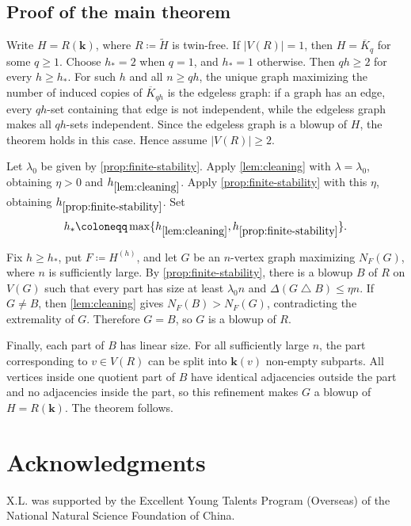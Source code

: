 \documentclass[10pt]{article}
\theoremstyle{plain}
\theoremstyle{remark}
\newcommand{\symdiff}{\mathbin{\triangle}}
\begin{document}
\subsection{Proof of the main theorem}
\label{sec:main-proof}

Write $H=R(\mathbf k)$, where $R\coloneqq\widetilde H$ is twin-free. If $|V(R)|=1$, then $H=\overline K_q$ for some $q\ge1$. Choose $h_*=2$ when $q=1$, and $h_*=1$ otherwise. Then $qh\ge2$ for every $h\ge h_*$. For such $h$ and all $n\ge qh$, the unique graph maximizing the number of induced copies of $\overline K_{qh}$ is the edgeless graph: if a graph has an edge, every $qh$-set containing that edge is not independent, while the edgeless graph makes all $qh$-sets independent. Since the edgeless graph is a blowup of $H$, the theorem holds in this case. Hence assume $|V(R)|\ge2$.

Let $\lambda_0$ be given by \cref{prop:finite-stability}. Apply \cref{lem:cleaning} with $\lambda=\lambda_0$, obtaining $\eta>0$ and $h_{\ref{lem:cleaning}}$. Apply \cref{prop:finite-stability} with this $\eta$, obtaining $h_{\ref{prop:finite-stability}}$. Set
\[
        h_*\coloneqq\max\{h_{\ref{lem:cleaning}},h_{\ref{prop:finite-stability}}\}.
\]

Fix $h\ge h_*$, put $F\coloneqq H^{(h)}$, and let $G$ be an $n$-vertex graph maximizing $N_F(G)$, where $n$ is sufficiently large. By \cref{prop:finite-stability}, there is a blowup $B$ of $R$ on $V(G)$ such that every part has size at least $\lambda_0 n$ and $\Delta(G\symdiff B)\le\eta n$. If $G\ne B$, then \cref{lem:cleaning} gives $N_F(B)>N_F(G)$, contradicting the extremality of $G$. Therefore $G=B$, so $G$ is a blowup of $R$.

Finally, each part of $B$ has linear size. For all sufficiently large $n$, the part corresponding to $v\in V(R)$ can be split into $\mathbf k(v)$ non-empty subparts. All vertices inside one quotient part of $B$ have identical adjacencies outside the part and no adjacencies inside the part, so this refinement makes $G$ a blowup of $H=R(\mathbf k)$. The theorem follows.

\section*{Acknowledgments}

\begin{sloppypar}
X.L. was supported by the Excellent Young Talents Program (Overseas) of the National Natural Science Foundation of China.
\end{sloppypar}



\end{document}
